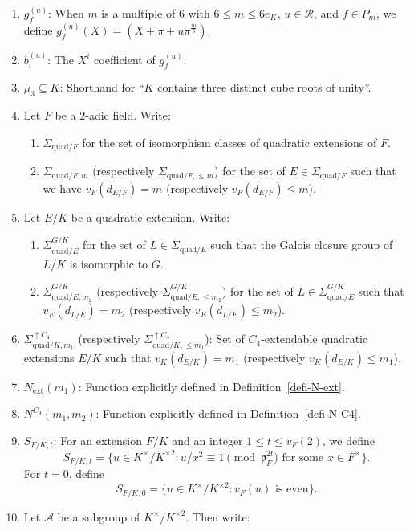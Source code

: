 \documentclass[11pt]{amsart}
\theoremstyle{theorem}
\theoremstyle{example}
\theoremstyle{definition}
\numberwithin{theorem}{section}
\numberwithin{theorem}{section}
\newcommand{\p}{\mathfrak{p}}
\newcommand{\ext}{\mathrm{ext}}
\newcommand{\quadr}{\mathrm{quad}}
\begin{document}
\begin{enumerate}
    \item $g_f^{(u)}$: When $m$ is a multiple of $6$ with $6 \leq m \leq 6e_K$, $u \in \mathcal{R}$, and $f \in P_m$, we define $g_f^{(u)}(X) = (X + \pi + u\pi^{\frac{m}{3}})$. 
    \item $b_i^{(u)}$: The $X^i$ coefficient of $g_f^{(u)}$. 
    \item $\mu_3 \subseteq K$: Shorthand for ``$K$ contains three distinct cube roots of unity''. 
    \item Let $F$ be a $2$-adic field. Write:
    \begin{enumerate}
    \item $\Sigma_{\quadr/F}$ for the set of isomorphism classes of quadratic extensions of $F$. 
    \item $\Sigma_{\quadr/F,m}$ (respectively $\Sigma_{\quadr/F,\leq m}$) for the set of $E \in \Sigma_{\quadr/F}$ such that we have $v_F(d_{E/F}) = m$ (respectively $v_F(d_{E/F}) \leq m$).
    \end{enumerate}
    \item Let $E/K$ be a quadratic extension. Write: 
    \begin{enumerate}
    \item $\Sigma_{\quadr/E}^{G/K}$ for the set of $L \in \Sigma_{\quadr/E}$ such that the Galois closure group of $L/K$ is isomorphic to $G$. 
    \item $\Sigma_{\quadr/E,m_2}^{G/K}$ (respectively $\Sigma_{\quadr/E, \leq m_2}^{G/K}$) for the set of $L \in \Sigma_{\quadr/E}^{G/K}$ such that $v_E(d_{L/E}) = m_2$ (respectively $v_E(d_{L/E}) \leq m_2$). 
    \end{enumerate}
    \item $\Sigma_{\quadr/K,m_1}^{\uparrow C_4}$ (respectively $\Sigma_{\quadr/K,\leq m_1}^{\uparrow C_4}$): Set of $C_4$-extendable quadratic extensions $E/K$ such that $v_K(d_{E/K}) = m_1$ (respectively $v_K(d_{E/K}) \leq m_1$).   
    \item $N_\ext(m_1)$: Function explicitly defined in Definition~\ref{defi-N-ext}.
    \item $N^{C_4}(m_1,m_2)$: Function explicitly defined in Definition~\ref{defi-N-C4}.
    \item $S_{F/K, t}$: For an extension $F/K$ and an integer $1 \leq t \leq v_F(2)$, we define 
    $$
    S_{F/K,t} = \{u \in K^\times / K^{\times 2} : u/x^2 \equiv 1 \pmod{\p_F^{2t}} \text{ for some $x \in F^\times$}\}.
    $$
    For $t=0$, define $$S_{F/K,0} = \{u \in K^\times / K^{\times 2} : v_F(u) \text{ is even}\}.$$
    \item Let $\mathcal{A}$ be a subgroup of $K^\times / K^{\times 2}$. Then write: 

\end{enumerate}
\end{document}
